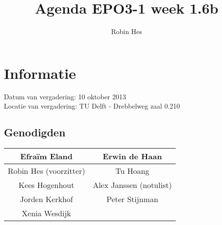 \documentclass{article}
\begin{document}
\title{Agenda EPO3-1 week 1.6b}%
\author{Robin Hes}%
\maketitle

\section*{Informatie}
Datum van vergadering: 10 oktober 2013\\ %
Locatie van vergadering: TU Delft - Drebbelweg zaal 0.210 %
\subsection*{Genodigden}
\begin{center}
\begin{tabular}{|c |c |}
	\hline
	Efraïm Eland & Erwin de Haan \\
	\hline
	Robin Hes (voorzitter) & Tu Hoang \\
	\hline
	Kees Hogenhout & Alex Janssen (notulist) \\
	\hline
	Jorden Kerkhof & Peter Stijnman \\
	\hline
	Xenia Wesdijk & \\
	\hline
\end{tabular}
\end{center}
\end{document}
